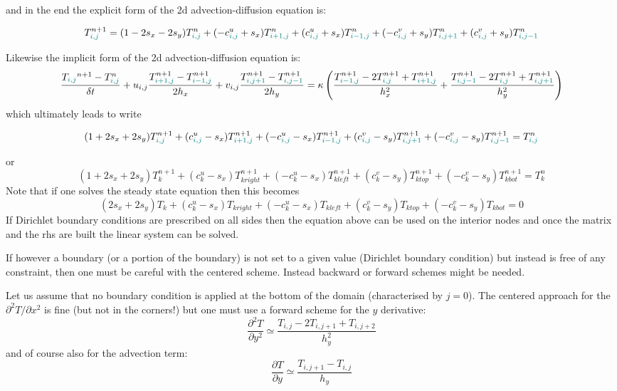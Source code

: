 and in the end the explicit form of the 2d advection-diffusion equation is:
\begin{mdframed}[backgroundcolor=blue!5]
\[
T_{{\color{teal}i,j}}^{n+1}
=(1-2s_x-2s_y)T^n_{\color{teal}i,j}
+(-c^u_{{\color{teal} i,j}}+s_x)T^n_{\color{teal}i+1,j}
+(c^u_{{\color{teal} i,j}}+s_x)T^n_{{\color{teal}i-1,j}}
+(-c^v_{{\color{teal} i,j}}+s_y)T^n_{\color{teal}i,j+1}
+(c^v_{{\color{teal} i,j}}+s_y)T^n_{{\color{teal}i,j-1}}
\]
\end{mdframed}
Likewise the implicit form of the 2d advection-diffusion equation is:
\[
\frac{T_{\color{teal}i,j}^{n+1}-T^n_{\color{teal}i,j}}{\delta t} 
+ u_{i,j} \frac{T^{n+1}_{\color{teal}i+1,j} - T^{n+1}_{{\color{teal}i-1,j}}}{2h_x} 
+ v_{i,j} \frac{T^{n+1}_{\color{teal}i,j+1} - T^{n+1}_{{\color{teal}i,j-1}}}{2h_y} =
\kappa 
\left(
\frac{ T_{{\color{teal}i-1,j}}^{n+1}-2T_{{\color{teal}i,j}}^{n+1}+T_{{\color{teal}i+1,j}}^{n+1}  }{h_x^2} + 
\frac{ T_{{\color{teal}i,j-1}}^{n+1}-2T_{{\color{teal}i,j}}^{n+1}+T_{{\color{teal}i,j+1}}^{n+1}  }{h_y^2}
\right)
\]
which ultimately leads to write
\begin{mdframed}[backgroundcolor=blue!5]
\[
(1+2s_x+2s_y)T_{{\color{teal}i,j}}^{n+1}
+(c^u_{{\color{teal} i,j}}-s_x)T_{{\color{teal}i+1,j}}^{n+1}
+(-c^u_{{\color{teal} i,j}}-s_x)T_{{\color{teal}i-1,j}}^{n+1}
+(c^v_{{\color{teal} i,j}}-s_y)T_{{\color{teal}i,j+1}}^{n+1}
+(-c^v_{{\color{teal} i,j}}-s_y)T_{{\color{teal}i,j-1}}^{n+1}
=T^n_{\color{teal}i,j}
\]
\end{mdframed}
or
\[
(1+2s_x+2s_y)T_{k}^{n+1}
+(c^u_{k}-s_x)T_{kright}^{n+1}
+(-c^u_{k}-s_x)T_{kleft}^{n+1}
+(c^v_{k}-s_y)T_{ktop}^{n+1}
+(-c^v_{k}-s_y)T_{kbot}^{n+1}
=T^n_{k}
\]
Note that if one solves the steady state equation then this becomes
\[
(2s_x+2s_y)T_{k}
+(c^u_{k}-s_x)T_{kright}
+(-c^u_{k}-s_x)T_{kleft}
+(c^v_{k}-s_y)T_{ktop}
+(-c^v_{k}-s_y)T_{kbot}
=0
\]
If Dirichlet boundary conditions are prescribed on all sides then the 
equation above can be used on the interior nodes and once the matrix and the 
rhs are built the linear system can be solved. 

If however a boundary (or a portion of the boundary) is not set to a given value (Dirichlet boundary condition) but instead is free of any constraint, then one must be careful with 
the centered scheme. Instead backward or forward schemes might be needed. 

Let us assume that no boundary condition is applied at the bottom of the domain (characterised by $j=0$). The centered approach for the $\partial^2 T/ \partial x^2$ is fine (but not in the corners!) but one must use a forward scheme for the $y$ derivative:
\[
\frac{\partial^2 T}{\partial y^2}  \simeq \frac{T_{i,j}-2T_{i,j+1}+T_{i,j+2}}{h_y^2}
\]
and of course also for the advection term:
\[
\frac{\partial T}{\partial y}  \simeq  \frac{T_{i,j+1}-T_{i,j}}{h_y}
\]

